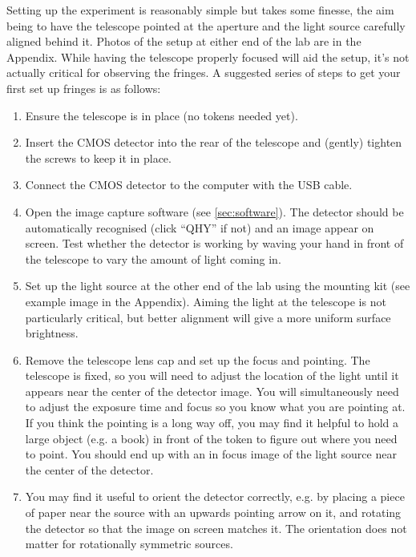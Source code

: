 \documentclass[11pt]{article}
\begin{document}
Setting up the experiment is reasonably simple but takes some finesse, the aim being to have the telescope pointed at the aperture and the light source carefully aligned behind it. Photos of the setup at either end of the lab are in the Appendix. While having the telescope properly focused will aid the setup, it's not actually critical for observing the fringes. A suggested series of steps to get your first set up fringes is as follows:

\begin{enumerate}
    \item Ensure the telescope is in place (no tokens needed yet).
    \item Insert the CMOS detector into the rear of the telescope and (gently) tighten the screws to keep it in place.
    \item Connect the CMOS detector to the computer with the USB cable.
    \item Open the image capture software (see \ref{sec:software}). The detector should be automatically recognised (click ``QHY'' if not) and an image appear on screen. Test whether the detector is working by waving your hand in front of the telescope to vary the amount of light coming in.
    \item Set up the light source at the other end of the lab using the mounting kit (see example image in the Appendix). Aiming the light at the telescope is not particularly critical, but better alignment will give a more uniform surface brightness.
    \item Remove the telescope lens cap and set up the focus and pointing. The telescope is fixed, so you will need to adjust the location of the light until it appears near the center of the detector image. You will simultaneously need to adjust the exposure time and focus so you know what you are pointing at. If you think the pointing is a long way off, you may find it helpful to hold a large object (e.g. a book) in front of the token to figure out where you need to point. You should end up with an in focus image of the light source near the center of the detector.
    \item You may find it useful to orient the detector correctly, e.g. by placing a piece of paper near the source with an upwards pointing arrow on it, and rotating the detector so that the image on screen matches it. The orientation does not matter for rotationally symmetric sources.

\end{enumerate}
\end{document}
